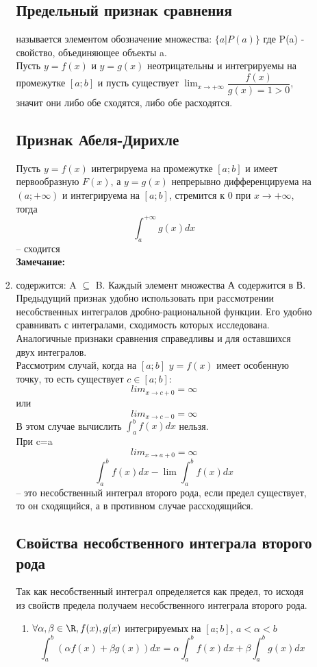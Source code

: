 \documentclass[oneside]{book}
\begin{document}
\begin{enumerate}
\begin{itemize}
\begin{enumerate}
 \subsection{Предельный признак сравнения}
называется элементом обозначение множества: $\{a | P(a)\}$ где P(a) - свойство, объединяющее объекты a.\\
Пусть  $y=f(x)$ и $y=g(x)$ неотрицательны и интегрируемы на промежутке $[a;b]$ и пусть существует $\lim_{x\to{+\infty}}\dfrac{f(x)}{g(x)=1>0}$, значит они либо обе сходятся, либо обе расходятся.
\subsection{Признак Абеля-Дирихле} {\huge \color{red}{КАК ЭТИ ВЕЩИ ВООБЩЕ СВЯЗАНЫ?}}
Пусть  $y=f(x)$ интегрируема на промежутке $[a;b]$  и имеет первообразную $F(x)$, а $y=g(x)$ непрерывно дифференцируема на $(a;+\infty)$ и интегрируема на $[a;b]$, стремится к 0 при $x\to{+\infty}$, тогда $$\int_{a}^{+\infty}g(x)dx$$ -- сходится\\
\textbf{Замечание:}\\
    \item содержится: A $\subseteq$ B. Каждый элемент множества А содержится в В.
      Предыдущий признак удобно использовать при рассмотрении несобственных интегралов дробно-рациональной функции. Его удобно сравнивать с интегралами, сходимость которых исследована. Аналогичные признаки сравнения справедливы и для оставшихся двух интегралов.\\
Рассмотрим случай, когда на $[a;b]$ $y=f(x)$ имеет особенную точку, то есть существует $c\in[a;b]$:
$$lim_{x\to{c+0}}=\infty$$ или $$lim_{x\to{c-0}}=\infty$$
В этом случае вычислить $\int_{a}^{b}f(x)dx$ нельзя.\\{\huge\color{red}{на этом месте я опять отключился}}
При c=a $$lim_{x\to{a+0}}=\infty$$
$$\int_{a}^{b}f(x)dx-\lim\int_{a}^{b}f(x)dx$$ --
это несобственный интеграл второго рода, если предел существует, то он сходящийся, а в противном случае рассходящийся.{\huge\color{red}{тут чет то невнятное пропустил}}

\subsection{Свойства несобственного интеграла второго рода}
Так как несобственный интеграл определяется как предел, то исходя из свойств предела получаем несобственного интеграла второго рода.
\begin{enumerate}[label=\arabic*.]
\item $\forall \alpha,\beta \in \R, f(x),g(x)$ интегрируемых на $[a;b]$, $a<\alpha<b$
$$\int_{a}^{b}(\alpha f(x)+\beta g(x))dx = \alpha \int_{a}^{b}f(x)dx+\beta \int_{a}^{b}g(x)dx$$


\end{enumerate}
\end{enumerate}
\end{itemize}
\end{enumerate}
\end{document}
